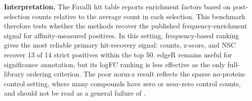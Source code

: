 \textbf{Interpretation.}
The Favalli hit table reports enrichment factors based on post-selection counts
relative to the average count in each selection. This benchmark therefore tests
whether the methods recover the published frequency-enrichment signal for
affinity-measured positives. In this setting, frequency-based ranking gives the
most reliable primary hit-recovery signal: \delthit{} counts, \delthit{}
z-score, and \deli{} NSC recover 13 of 14 strict positives within the top 50.
edgeR remains useful for significance annotation, but its logFC ranking is less
effective as the only full-library ordering criterion. The poor \deli{} norm-z
result reflects the sparse no-protein-control setting, where many compounds
have zero or near-zero control counts, and should not be read as a general
failure of \deli{}.
